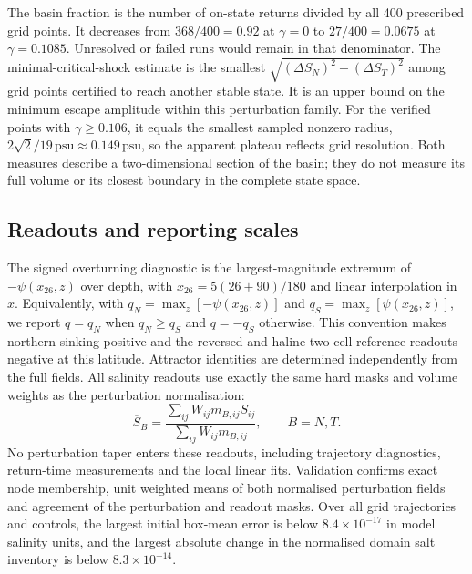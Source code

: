 \documentclass[12pt, a4paper]{article}
\newcommand{\psu}{\,\text{psu}}
\begin{document}
The basin fraction is the number of on-state returns divided by all 400 prescribed grid points. It decreases from $368/400=0.92$ at $\gamma=0$ to $27/400=0.0675$ at $\gamma=0.1085$. Unresolved or failed runs would remain in that denominator. The minimal-critical-shock estimate is the smallest $\sqrt{(\Delta S_N)^2+(\Delta S_T)^2}$ among grid points certified to reach another stable state. It is an upper bound on the minimum escape amplitude within this perturbation family. For the verified points with $\gamma\geq0.106$, it equals the smallest sampled nonzero radius, $2\sqrt{2}/19\psu{}\approx0.149\psu{}$, so the apparent plateau reflects grid resolution. Both measures describe a two-dimensional section of the basin; they do not measure its full volume or its closest boundary in the complete state space.

\subsection*{Readouts and reporting scales}

The signed overturning diagnostic is the largest-magnitude extremum of $-\psi(x_{26},z)$ over depth, with $x_{26}=5(26+90)/180$ and linear interpolation in $x$. Equivalently, with $q_N=\max_z[-\psi(x_{26},z)]$ and $q_S=\max_z[\psi(x_{26},z)]$, we report $q=q_N$ when $q_N\geq q_S$ and $q=-q_S$ otherwise. This convention makes northern sinking positive and the reversed and haline two-cell reference readouts negative at this latitude. Attractor identities are determined independently from the full fields. All salinity readouts use exactly the same hard masks and volume weights as the perturbation normalisation:
\begin{equation}
  \overline S_B=\frac{\sum_{ij}W_{ij}m_{B,ij}S_{ij}}{\sum_{ij}W_{ij}m_{B,ij}},\qquad B=N,T.
\end{equation}
No perturbation taper enters these readouts, including trajectory diagnostics, return-time measurements and the local linear fits. Validation confirms exact node membership, unit weighted means of both normalised perturbation fields and agreement of the perturbation and readout masks. Over all grid trajectories and controls, the largest initial box-mean error is below $8.4\times10^{-17}$ in model salinity units, and the largest absolute change in the normalised domain salt inventory is below $8.3\times10^{-14}$.
\end{document}
